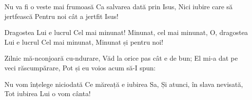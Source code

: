 \beginverse
Nu va fi o veste mai frumoasă
Ca salvarea dată prin Isus,
Nici iubire care să jertfească
Pentru noi cât a jertfit Isus!
\endverse

\beginchorus
Dragostea Lui e lucrul
Cel mai minunat!
Minunat, cel mai minunat,
O, dragostea Lui e lucrul
Cel mai minunat,
Minunat și pentru noi!
\endchorus

\beginverse
Zilnic mă-nconjoară cu-ndurare,
Văd la orice pas cât e de bun;
El mi-a dat pe veci răscumpărare,
Pot și eu voios acum să-I spun:
\endverse

\beginverse
Nu vom înțelege niciodată
Ce măreață e iubirea Sa,
Și atunci, în slava nevisată,
Tot iubirea Lui o vom cânta!
\endverse
\endsong